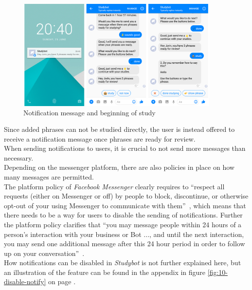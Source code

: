 \begin{figure}[h]
  \centering
  \includegraphics[width=0.9\textwidth]{images/interface/07-notify-study.png}
	\caption{Notification message and beginning of study}
	\label{fig:07-notify-study}
\end{figure}

Since added phrases can not be studied directly,
the user is instead offered to receive a notification message once phrases are ready for review.
\\

When sending notifications to users, it is crucial to not send more messages than necessary.
\\
Depending on the messenger platform, there are also policies in place on how many messages are permitted.
\\
The platform policy of \emph{Facebook Messenger} clearly requires to
``respect all requests (either on Messenger or off) by people to block, discontinue, or otherwise opt-out of your using Messenger to communicate with them''~\cite{fbpolicy},
which means that there needs to be a way for users to disable the sending of notifications.
Further the platform policy clarifies that ``you may message people within 24 hours of a person's interaction with your business or Bot ..., and until the next interaction, you may send one additional message after this 24 hour period in order to follow up on your conversation''~\cite{fbpolicy}.
\\
How notifications can be disabled in \emph{Studybot} is not further explained here,
but an illustration of the feature can be found in the appendix in figure \ref{fig:10-disable-notify} on page \pageref{fig:10-disable-notify}.
\\

